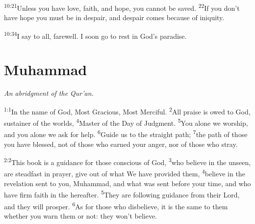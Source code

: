 \documentclass[openany,12pt,english]{book}
\newenvironment{para}{\par\pretolerance=100\tolerance=200\setlength{\emergencystretch}{0.6em}\relax}{\par}
\begin{document}
\begin{para}
    \textsuperscript{10:21}\thinspace{}Un\-less you have love, faith, and hope, you can\-not be saved.
    \textsuperscript{22}\thinspace{}If you don't have hope you must be in de\-spair, and de\-spair co\-mes be\-cause of in\-iq\-ui\-ty.
\end{para}

\begin{para}
    \textsuperscript{10:34}\thinspace{}I say to all, fare\-well. I soon go to rest in God's par\-a\-dise.
\end{para}

\chapter*{Muhammad}
\begin{changemargin}{.6in}{.6in}
  \begin{center}
    \itshape
    An a\-bridg\-ment of the Qur'an.
  \end{center}
\end{changemargin}
\begin{para}
    \textsuperscript{1:1}\thinspace{}In the name of God, Most Gra\-cious, Most Mer\-ci\-ful.
    \textsuperscript{2}\thinspace{}All praise is owed to God, sus\-tain\-er of the worlds,
    \textsuperscript{4}\thinspace{}Mas\-ter of the Day of Judg\-ment.
    \textsuperscript{5}\thinspace{}You a\-lone we wor\-ship, and you a\-lone we ask for help.
    \textsuperscript{6}\thinspace{}Guide us to the straight path;
    \textsuperscript{7}\thinspace{}the path of those you have bless\-ed, not of those who earned your an\-ger, nor of those who stray.
\end{para}

\bigskip{}

\begin{para}
    \textsuperscript{2:2}\thinspace{}This book is a guid\-ance for those con\-scious of God,
    \textsuperscript{3}\thinspace{}who be\-lieve in the un\-seen, are stead\-fast in pray\-er, give out of what We have pro\-vid\-ed them,
    \textsuperscript{4}\thinspace{}be\-lieve in the rev\-e\-la\-tion sent to you, Muhammad, and what was sent be\-fore your time, and who have firm faith in the here\-af\-ter.
    \textsuperscript{5}\thinspace{}They are fol\-low\-ing guid\-ance from their Lord, and they will pros\-per.
    \textsuperscript{6}\thinspace{}As for those who dis\-be\-lieve, it is the same to them wheth\-er you warn them or not: they won't be\-lieve.
\end{para}
\end{document}

